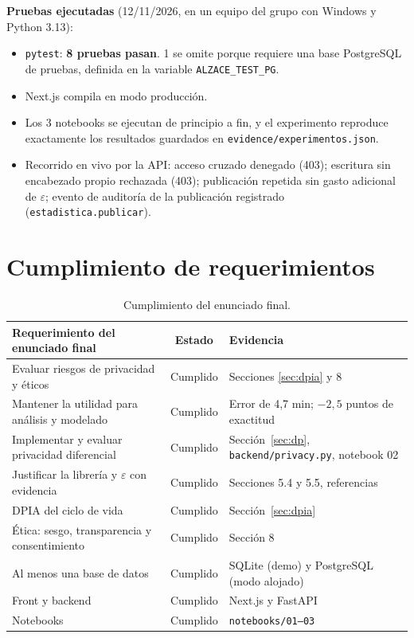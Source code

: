 \documentclass[11pt]{article}
\begin{document}
\textbf{Pruebas ejecutadas} (12/11/2026, en un equipo del grupo con Windows y Python 3.13):
\begin{itemize}[nosep]
  \item \texttt{pytest}: \textbf{8 pruebas pasan}. 1 se omite porque requiere una base PostgreSQL de pruebas, definida en la variable \texttt{ALZACE\_TEST\_PG}.
  \item Next.js compila en modo producción.
  \item Los 3 notebooks se ejecutan de principio a fin, y el experimento reproduce exactamente los resultados guardados en \texttt{evidence/experimentos.json}.
  \item Recorrido en vivo por la API: acceso cruzado denegado (403); escritura sin encabezado propio rechazada (403); publicación repetida sin gasto adicional de $\varepsilon$; evento de auditoría de la publicación registrado (\texttt{estadistica.\allowbreak publicar}).
\end{itemize}

\section{Cumplimiento de requerimientos}
\label{sec:cumplimiento}

\begin{table}[H]
\centering\small
\begin{tabularx}{\textwidth}{@{}p{6cm}cY@{}}
\toprule
\textbf{Requerimiento del enunciado final} & \textbf{Estado} & \textbf{Evidencia} \\
\midrule
Evaluar riesgos de privacidad y éticos & Cumplido & Secciones \ref{sec:dpia} y 8 \\
Mantener la utilidad para análisis y modelado & Cumplido & Error de 4,7 min; $-2{,}5$ puntos de exactitud \\
Implementar y evaluar privacidad diferencial & Cumplido & Sección~\ref{sec:dp}, \texttt{backend/privacy.py}, notebook 02 \\
Justificar la librería y $\varepsilon$ con evidencia & Cumplido & Secciones 5.4 y 5.5, referencias \\
DPIA del ciclo de vida & Cumplido & Sección~\ref{sec:dpia} \\
Ética: sesgo, transparencia y consentimiento & Cumplido & Sección 8 \\
Al menos una base de datos & Cumplido & SQLite (demo) y PostgreSQL (modo alojado) \\
Front y backend & Cumplido & Next.js y FastAPI \\
Notebooks & Cumplido & \texttt{notebooks/01--03} \\
\bottomrule
\end{tabularx}
\caption{Cumplimiento del enunciado final.}
\end{table}
\end{document}
